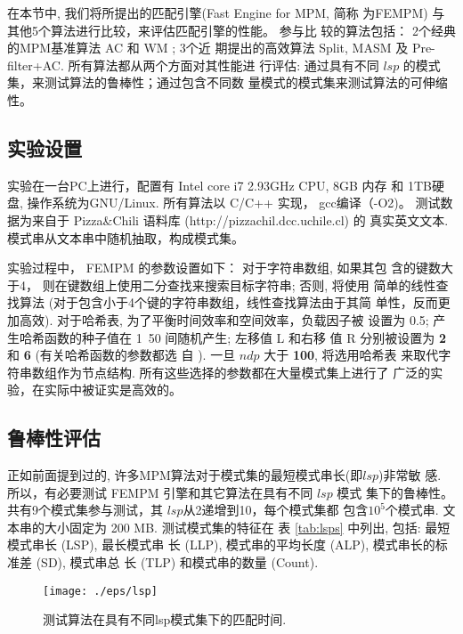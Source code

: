 \documentclass{ws-ijprai}
\begin{document}
在本节中, 我们将所提出的匹配引擎(Fast Engine for MPM, 简称
为\textsf{FEMPM}) 与其他5个算法进行比较，来评估匹配引擎的性能。 参与比
较的算法包括： 2个经典的MPM基准算法 \textsf{AC} 和 \textsf{WM} ; 3个近
期提出的高效算法 \textsf{Split},
\textsf{MASM} 及 \textsf{Pre-filter+AC}. 所有算法都从两个方面对其性能进
行评估: 通过具有不同 $lsp$ 的模式集，来测试算法的鲁棒性；通过包含不同数
量模式的模式集来测试算法的可伸缩性。

\subsection{实验设置}


实验在一台PC上进行，配置有 Intel core i7 2.93GHz CPU, 8GB 内存 和 1TB硬
盘, 操作系统为GNU/Linux. 所有算法以 C/C++ 实现， gcc编译（-O2)。 测试数
据为来自于 Pizza\;\&\;Chili 语料库 (http://pizzachil.dcc.uchile.cl) 的
真实英文文本. 模式串从文本串中随机抽取，构成模式集。

实验过程中， \textsf{FEMPM} 的参数设置如下： 对于字符串数组, 如果其包
含的键数大于4， 则在键数组上使用二分查找来搜索目标字符串; 否则, 将使用
简单的线性查找算法 (对于包含小于4个键的字符串数组，线性查找算法由于其简
单性，反而更加高效). 对于哈希表, 为了平衡时间效率和空间效率，负载因子被
设置为 {0.5}; 产生哈希函数的种子值在 1~50 间随机产生; 左移值 L 和右移
值 R 分别被设置为 \textbf{2} 和 \textbf{6} (有关哈希函数的参数都选
自 \cite{Ramakrishna1997}). 一旦 $ndp$ 大于 \textbf{100}, 将选用哈希表
来取代字符串数组作为节点结构. 所有这些选择的参数都在大量模式集上进行了
广泛的实验，在实际中被证实是高效的。

\subsection{鲁棒性评估}

正如前面提到过的, 许多MPM算法对于模式集的最短模式串长(即$lsp$)非常敏
感. 所以，有必要测试 \textsf{FEMPM} 引擎和其它算法在具有不同 $lsp$ 模式
集下的鲁棒性。 共有9个模式集参与测试，其 $lsp$从2递增到10，每个模式集都
包含$10^5$个模式串. 文本串的大小固定为 200 MB. 测试模式集的特征在
表 \ref{tab:lsps} 中列出, 包括: 最短模式串长 (LSP), 最长模式串
长 (LLP), 模式串的平均长度 (ALP), 模式串长的标准差 (SD), 模式串总
长 (TLP) 和模式串的数量 (Count).

\begin{figure}[htbp]
  \centering
  \texttt{[image: ./eps/lsp]}
  \caption{测试算法在具有不同lsp模式集下的匹配时间.}
  \label{fig:lsp}
\end{figure}
\end{document}
